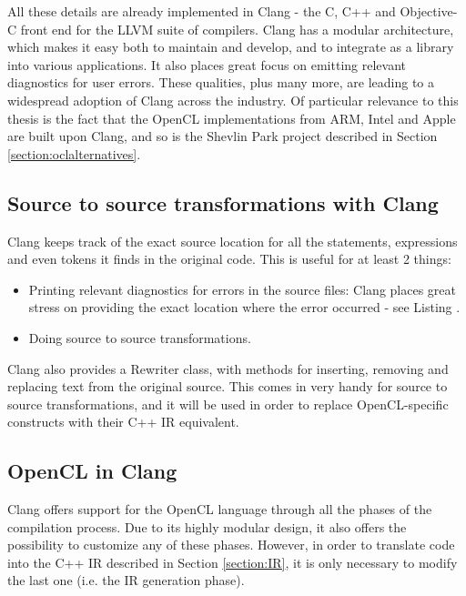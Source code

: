 All these details are already implemented in Clang - the C, C++ and Objective-C front end for the LLVM\cite{http://llvm.org/} suite of compilers. Clang has a modular architecture, which makes it easy both to maintain and develop, and to integrate as a library into various applications. It also places great focus on emitting relevant diagnostics for user errors. These qualities, plus many more\cite{http://clang.llvm.org/features.html}, are leading to a widespread adoption of Clang across the industry. Of particular relevance to this thesis is the fact that the OpenCL implementations from ARM, Intel and Apple are built upon Clang\cite{http://clang-developers.42468.n3.nabble.com/How-much-of-OpenCL-C-is-currently-supported-by-Clang-td4025963.html}, and so is the Shevlin Park project described in Section \ref{section:oclalternatives}.

\subsection{Source to source transformations with Clang}
Clang keeps track of the exact source location for all the statements, expressions and even tokens it finds in the original code. This is useful for at least 2 things:
\begin{itemize}
\item Printing relevant diagnostics for errors in the source files: Clang places great stress on providing the exact location where the error occurred - see Listing .
\item Doing source to source transformations.
\end{itemize}

Clang also provides a Rewriter class, with methods for inserting, removing and replacing text from the original source. This comes in very handy for source to source transformations, and it will be used in order to replace OpenCL-specific constructs with their C++ IR equivalent.

\subsection{OpenCL in Clang}
Clang offers support for the OpenCL language through all the phases of the compilation process. Due to its highly modular design, it also offers the possibility to customize any of these phases. However, in order to translate code into the C++ IR described in Section \ref{section:IR}, it is only necessary to modify the last one (i.e. the IR generation phase).

